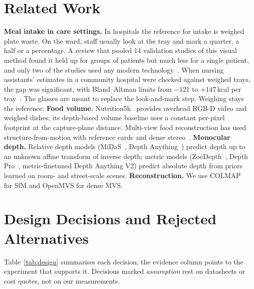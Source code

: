 \documentclass[conference]{IEEEtran}
\begin{document}
\section{Related Work}
\textbf{Meal intake in care settings.} In hospitals the reference for intake is
weighed plate waste. On the ward, staff usually look at the tray and mark a
quarter, a half or a percentage. A review that pooled 14 validation studies of
this visual method found it held up for groups of patients but much less for a
single patient, and only two of the studies used any modern
technology~\cite{heighington2022visual}. When nursing assistants' estimates in a
community hospital were checked against weighed trays, the gap was significant,
with Bland--Altman limits from $-121$ to $+147$\,kcal per
tray~\cite{kawasaki2016criterion}. The glasses are meant to replace the
look-and-mark step. Weighing stays the reference.
\textbf{Food volume.} Nutrition5k~\cite{thames2021nutrition5k} provides
overhead RGB-D video and weighed dishes; its depth-based volume baseline uses a
constant per-pixel footprint at the capture-plane distance. Multi-view food
reconstruction has used structure-from-motion with reference cards and dense
stereo~\cite{dehais2017two,lo2020image}. \textbf{Monocular depth.} Relative
depth models (MiDaS~\cite{ranftl2020midas}, Depth Anything~\cite{yang2024depthanything,yang2024depthanythingv2})
predict depth up to an unknown affine transform of inverse depth; metric models
(ZoeDepth~\cite{bhat2023zoedepth}, Depth Pro~\cite{bochkovskii2024depthpro},
metric-finetuned Depth Anything V2) predict absolute depth from priors learned on
room- and street-scale scenes. \textbf{Reconstruction.} We use COLMAP~\cite{schoenberger2016sfm}
for SfM and OpenMVS for dense MVS.

\section{Design Decisions and Rejected Alternatives}\label{sec:design}
Table~\ref{tab:design} summarises each decision; the evidence column points to
the experiment that supports it. Decisions marked \emph{assumption} rest on
datasheets or cost quotes, not on our measurements.
\end{document}
